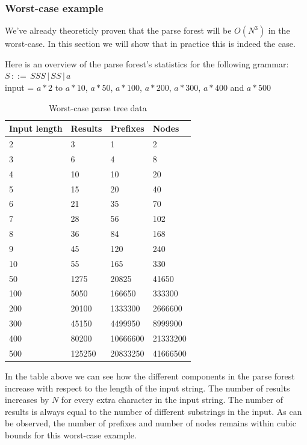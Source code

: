 \documentclass[a4paper,10pt]{article}
\begin{document}
\subsubsection{Worst-case example}
We've already theoreticly proven that the parse forest will be $O(N^3)$ in the worst-case. In this section we will show that in practice this is indeed the case.

Here is an overview of the parse forest's statistics for the following grammar:\\
$S\,::=\,SSS\,|\,SS\,|\,a$\\
input = $a * 2$ to $a * 10$, $a * 50$, $a * 100$, $a * 200$, $a * 300$, $a * 400$ and $a * 500$

\begin{table}[H]
\centering
\begin{tabular}{ | p{6em} | p{4em} | p{4em} | p{4em} | }
  \hline
  Input length & Results & Prefixes & Nodes \\
  \hline
  2 & 3 & 1 & 2 \\
  3 & 6 & 4 & 8 \\
  4 & 10 & 10 & 20 \\
  5 & 15 & 20 & 40 \\
  6 & 21 & 35 & 70 \\
  7 & 28 & 56 & 102 \\
  8 & 36 & 84 & 168 \\
  9 & 45 & 120 & 240 \\
  10 & 55 & 165 & 330 \\
  \hline
  50 & 1275 & 20825 & 41650 \\
  100 & 5050 & 166650 & 333300 \\
  200 & 20100 & 1333300 & 2666600 \\
  300 & 45150 & 4499950 & 8999900 \\
  400 & 80200 & 10666600 & 21333200 \\
  500 & 125250 & 20833250 & 41666500 \\
  \hline
\end{tabular}
\caption{Worst-case parse tree data}
\end{table}

In the table above we can see how the different components in the parse forest increase with respect to the length of the input string. The number of results increases by $N$ for every extra character in the input string. The number of results is always equal to the number of different substrings in the input. As can be observed, the number of prefixes and number of nodes remains within cubic bounds for this worst-case example.
\end{document}
